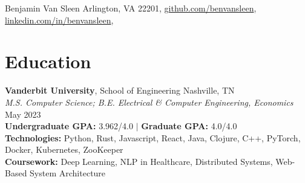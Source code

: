 \documentclass[10pt]{article}
\begin{document}
\resumeheader
{Benjamin Van Sleen}
{
	{Arlington, VA 22201},
	\href{https://github.com/benvansleen}{github.com/benvansleen},
	\href{https://linkedin.com/in/benvansleen}{linkedin.com/in/benvansleen},
}

\section*{Education}
\textbf{Vanderbit University}, School of Engineering \hfill Nashville, TN \\
\hspace*{1em}\textit{M.S. Computer Science; B.E. Electrical \& Computer Engineering, Economics} \hfill May 2023 \\
\textbf{Undergraduate GPA:} 3.962/4.0 $\mid$ \textbf{Graduate GPA:} 4.0/4.0 \\
\textbf{Technologies:} Python, Rust, Javascript, React, Java, Clojure, C++, PyTorch, Docker, Kubernetes, ZooKeeper \\
\textbf{Coursework:} Deep Learning, NLP in Healthcare, Distributed Systems, Web-Based System Architecture
\end{document}
